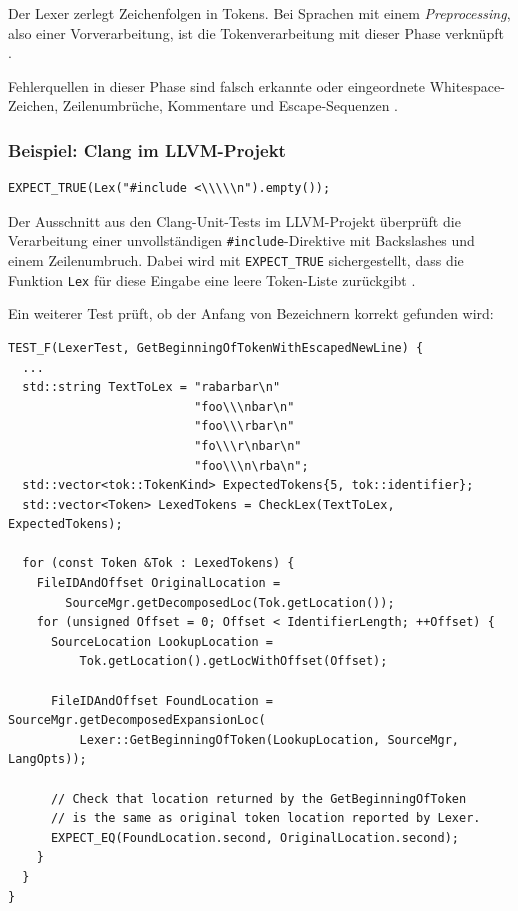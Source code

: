 \documentclass[11pt,a4paper]{article}
\newcommand{\code}[1]{\texttt{#1}}
\begin{document}
Der Lexer zerlegt Zeichenfolgen in Tokens. Bei Sprachen mit einem \emph{Preprocessing}, also einer Vorverarbeitung, ist die Tokenverarbeitung mit dieser Phase verknüpft \parencite{clang}.

Fehlerquellen in dieser Phase sind falsch erkannte oder eingeordnete Whitespace-Zeichen, Zeilenumbrüche, Kommentare und Escape-Sequenzen \parencite{gcc_preprocessor_internals}.

\subsubsection{Beispiel: Clang im LLVM-Projekt}

\begin{lstlisting}[caption={Originalprüfzeile für eine unvollständige Include-Direktive}]
EXPECT_TRUE(Lex("#include <\\\\\n").empty());
\end{lstlisting}

Der Ausschnitt aus den Clang-Unit-Tests im LLVM-Projekt überprüft die Verarbeitung einer unvollständigen \texttt{\#include}-Direktive mit Backslashes und einem Zeilenumbruch. Dabei wird mit \texttt{EXPECT\_TRUE} sichergestellt, dass die Funktion \code{Lex} für diese Eingabe eine leere Token-Liste zurückgibt \parencite{llvm_lexer_test}.

Ein weiterer Test prüft, ob der Anfang von Bezeichnern korrekt gefunden wird:

\begin{lstlisting}[caption={Gekürzter Clang-Test für Tokenpositionen bei Zeilenumbrüchen}]
TEST_F(LexerTest, GetBeginningOfTokenWithEscapedNewLine) {
  ...
  std::string TextToLex = "rabarbar\n"
                          "foo\\\nbar\n"
                          "foo\\\rbar\n"
                          "fo\\\r\nbar\n"
                          "foo\\\n\rba\n";
  std::vector<tok::TokenKind> ExpectedTokens{5, tok::identifier};
  std::vector<Token> LexedTokens = CheckLex(TextToLex, ExpectedTokens);

  for (const Token &Tok : LexedTokens) {
    FileIDAndOffset OriginalLocation =
        SourceMgr.getDecomposedLoc(Tok.getLocation());
    for (unsigned Offset = 0; Offset < IdentifierLength; ++Offset) {
      SourceLocation LookupLocation =
          Tok.getLocation().getLocWithOffset(Offset);

      FileIDAndOffset FoundLocation = SourceMgr.getDecomposedExpansionLoc(
          Lexer::GetBeginningOfToken(LookupLocation, SourceMgr, LangOpts));

      // Check that location returned by the GetBeginningOfToken
      // is the same as original token location reported by Lexer.
      EXPECT_EQ(FoundLocation.second, OriginalLocation.second);
    }
  }
}

\end{lstlisting}
\end{document}

